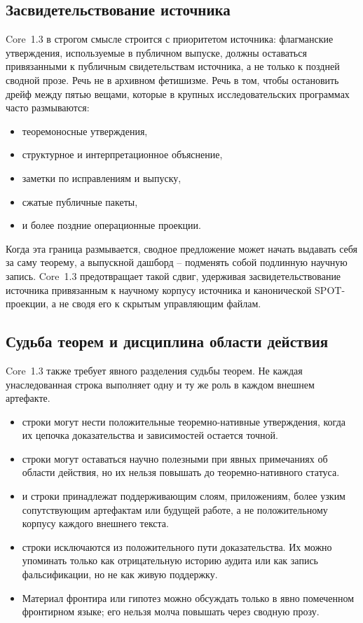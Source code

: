\subsection{Засвидетельствование источника}

Core~1.3 в строгом смысле строится с приоритетом источника: флагманские
утверждения, используемые в публичном выпуске, должны оставаться привязанными
к публичным свидетельствам источника, а не только к поздней сводной прозе.
Речь не в архивном фетишизме. Речь в том, чтобы остановить дрейф между пятью
вещами, которые в крупных исследовательских программах часто размываются:

\begin{itemize}
\item теоремоносные утверждения,
\item структурное и интерпретационное объяснение,
\item заметки по исправлениям и выпуску,
\item сжатые публичные пакеты,
\item и более поздние операционные проекции.
\end{itemize}

Когда эта граница размывается, сводное предложение может начать выдавать себя
за саму теорему, а выпускной дашборд -- подменять собой подлинную научную
запись. Core~1.3 предотвращает такой сдвиг, удерживая засвидетельствование
источника привязанным к научному корпусу источника и канонической
SPOT-проекции, а не сводя его к скрытым управляющим файлам.

\subsection{Судьба теорем и дисциплина области действия}

Core~1.3 также требует явного разделения судьбы теорем. Не каждая унаследованная
строка выполняет одну и ту же роль в каждом внешнем артефакте.

\begin{itemize}
\item {} строки могут нести положительные
      теоремно-нативные утверждения, когда их цепочка доказательства и
      зависимостей остается точной.
\item {} строки могут оставаться научно полезными при явных
      примечаниях об области действия, но их нельзя повышать до
      теоремно-нативного статуса.
\item {} и  строки принадлежат
      поддерживающим слоям, приложениям, более узким сопутствующим артефактам
      или будущей работе, а не положительному корпусу каждого внешнего текста.
\item {} строки исключаются из положительного пути доказательства.
      Их можно упоминать только как отрицательную историю аудита или как запись
      фальсификации, но не как живую поддержку.
\item Материал фронтира или гипотез можно обсуждать только в явно помеченном
      фронтирном языке; его нельзя молча повышать через сводную прозу.
\end{itemize}


